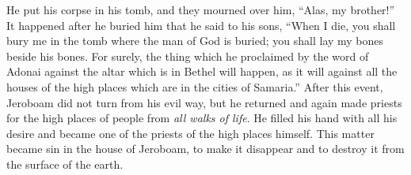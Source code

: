 \begin{biblechapter}
\verse He put his corpse in his tomb, and they mourned over him, “Alas, my brother!”
\verse It happened after he buried him that he said to his sons, “When I die, you shall bury me in the tomb where the man of God is buried; you shall lay my bones beside his bones.
\verse For surely, the thing which he proclaimed by the word of Adonai against the altar which is in Bethel will happen, as it will against all the houses of the high places which are in the cities of Samaria.”
 After this event, Jeroboam did not turn from his evil way, but he returned and again made priests for the high places of people from \textit{all walks of life}. He filled his hand with all his desire and became one of the priests of the high places himself.
\verse This matter became sin in the house of Jeroboam, to make it disappear and to destroy it from the surface of the earth.
\end{biblechapter}

